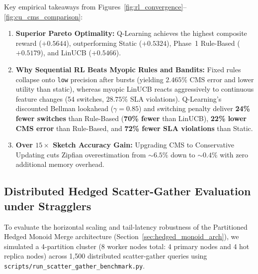 Key empirical takeaways from Figures~\ref{fig:rl_convergence}--\ref{fig:cu_cms_comparison}:
\begin{enumerate}
    \item \textbf{Superior Pareto Optimality:} Q-Learning achieves the highest composite reward ($+0.5644$), outperforming Static ($+0.5324$), Phase~1 Rule-Based ($+0.5179$), and LinUCB ($+0.5466$).
    \item \textbf{Why Sequential RL Beats Myopic Rules and Bandits:} Fixed rules collapse onto \texttt{low} precision after bursts (yielding $2.465\%$ CMS error and lower utility than static), whereas myopic LinUCB reacts aggressively to continuous feature changes (54 switches, $28.75\%$ SLA violations). Q-Learning's discounted Bellman lookahead ($\gamma=0.85$) and switching penalty deliver \textbf{24\% fewer switches} than Rule-Based (\textbf{70\% fewer} than LinUCB), \textbf{22\% lower CMS error} than Rule-Based, and \textbf{72\% fewer SLA violations} than Static.
    \item \textbf{Over $15\times$ Sketch Accuracy Gain:} Upgrading CMS to Conservative Updating cuts Zipfian overestimation from $\sim 6.5\%$ down to $\sim 0.4\%$ with zero additional memory overhead.
\end{enumerate}

\subsection{Distributed Hedged Scatter-Gather Evaluation under Stragglers}
\label{sec:hedged_evaluation}

To evaluate the horizontal scaling and tail-latency robustness of the Partitioned Hedged Monoid Merge architecture (Section~\ref{sec:hedged_monoid_arch}), we simulated a 4-partition cluster (8 worker nodes total: 4 primary nodes and 4 hot replica nodes) across 1,500 distributed scatter-gather queries using \texttt{scripts/run\_scatter\_gather\_benchmark.py}.

